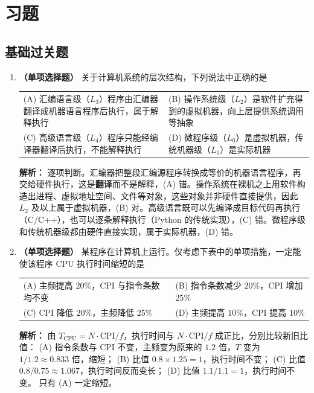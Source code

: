 \section{习题}

\subsection{基础过关题}

\begin{enumerate}

\item \textbf{（单项选择题）} 关于计算机系统的层次结构，下列说法中正确的是
\begin{center}
\begin{tabularx}{0.96\linewidth}{@{}X X@{}}
(A) 汇编语言级（$L_3$）程序由汇编器翻译成机器语言程序后执行，属于解释执行 & (B) 操作系统级（$L_2$）是软件扩充得到的虚拟机器，向上层提供系统调用等抽象 \\[4pt]
(C) 高级语言级（$L_4$）程序只能经编译器翻译后执行，不能解释执行 & (D) 微程序级（$L_0$）是虚拟机器，传统机器级（$L_1$）是实际机器
\end{tabularx}
\end{center}

\ifshowsolutions\par\noindent\textbf{解析：} 逐项判断。汇编器把整段汇编源程序转换成等价的机器语言程序，再交给硬件执行，这是\textbf{翻译}而不是解释，(A) 错。操作系统在裸机之上用软件构造出进程、虚拟地址空间、文件等对象，这些对象并非硬件直接提供，因此 $L_2$ 及以上属于虚拟机器，(B) 对。高级语言既可以先编译成目标代码再执行（C/C++），也可以逐条解释执行（Python 的传统实现），(C) 错。微程序级和传统机器级都由硬件直接实现，属于实际机器，(D) 错。\else \answerarea \fi

\item \textbf{（单项选择题）} 某程序在计算机上运行。仅考虑下表中的单项措施，一定能使该程序 CPU 执行时间缩短的是
\begin{center}
\begin{tabularx}{0.96\linewidth}{@{}X X@{}}
(A) 主频提高 $20\%$，CPI 与指令条数均不变 & (B) 指令条数减少 $20\%$，CPI 增加 $25\%$ \\[4pt]
(C) CPI 降低 $20\%$，主频降低 $25\%$ & (D) 主频提高 $10\%$，CPI 提高 $10\%$
\end{tabularx}
\end{center}

\ifshowsolutions\par\noindent\textbf{解析：} 由 $T_{\text{CPU}}=N\cdot\mathrm{CPI}/f$，执行时间与 $N\cdot\mathrm{CPI}/f$ 成正比，分别比较新旧比值：
(A) 指令条数与 CPI 不变，主频变为原来的 $1.2$ 倍，$T$ 变为 $1/1.2\approx0.833$ 倍，缩短；
(B) 比值 $0.8\times1.25=1$，执行时间不变；
(C) 比值 $0.8/0.75\approx1.067$，执行时间反而变长；
(D) 比值 $1.1/1.1=1$，执行时间不变。
只有 (A) 一定缩短。\else \answerarea \fi


\end{enumerate}
